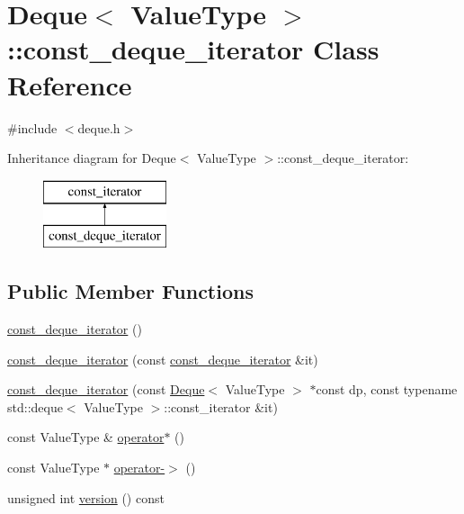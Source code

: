\hypertarget{classDeque_1_1const__deque__iterator}{}\section{Deque$<$ Value\+Type $>$\+:\+:const\+\_\+deque\+\_\+iterator Class Reference}
\label{classDeque_1_1const__deque__iterator}


{\ttfamily \#include $<$deque.\+h$>$}

Inheritance diagram for Deque$<$ Value\+Type $>$\+:\+:const\+\_\+deque\+\_\+iterator\+:\begin{figure}[H]
\begin{center}
\leavevmode
\includegraphics[height=2.000000cm]{classDeque_1_1const__deque__iterator}
\end{center}
\end{figure}
\subsection*{Public Member Functions}
\begin{DoxyCompactItemize}
\item 
\mbox{\hyperlink{classDeque_1_1const__deque__iterator_abd296dc4a6bbc1cd5cbcb2d8e20a30a5}{const\+\_\+deque\+\_\+iterator}} ()
\item 
\mbox{\hyperlink{classDeque_1_1const__deque__iterator_afd3c54e6916f271f7a7adeb494fc3511}{const\+\_\+deque\+\_\+iterator}} (const \mbox{\hyperlink{classDeque_1_1const__deque__iterator}{const\+\_\+deque\+\_\+iterator}} \&it)
\item 
\mbox{\hyperlink{classDeque_1_1const__deque__iterator_a3ef43f2cdb4f9ae9a25b6ca6118b35ea}{const\+\_\+deque\+\_\+iterator}} (const \mbox{\hyperlink{classDeque}{Deque}}$<$ Value\+Type $>$ $\ast$const dp, const typename std\+::deque$<$ Value\+Type $>$\+::const\+\_\+iterator \&it)
\item 
const Value\+Type \& \mbox{\hyperlink{classDeque_1_1const__deque__iterator_a9c07102d483ddb20c4254830707a002f}{operator$\ast$}} ()
\item 
const Value\+Type $\ast$ \mbox{\hyperlink{classDeque_1_1const__deque__iterator_af8c0032fa6fb18e0c8b9b394a302a185}{operator-\/$>$}} ()
\item 
unsigned int \mbox{\hyperlink{classDeque_1_1const__deque__iterator_a0aa696ccb72cbf928535d6b646bac1aa}{version}} () const
\end{DoxyCompactItemize}



